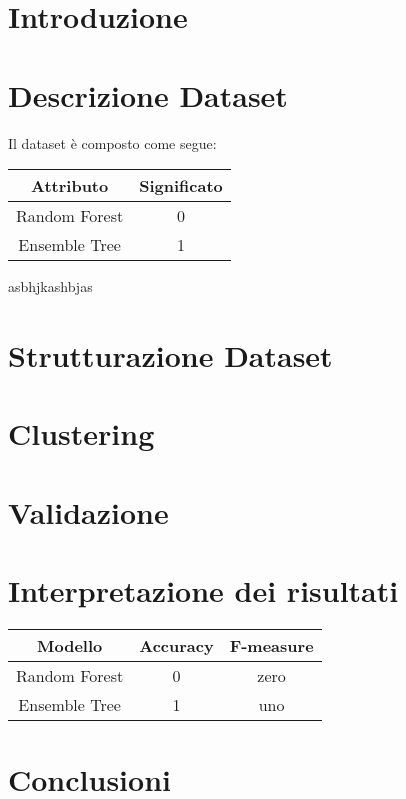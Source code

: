 \documentclass[10pt, a4paper,openany]{article}
\begin{document}
\begin{multicols}{2}
	
\section*{Introduzione}
\section*{Descrizione Dataset}
Il dataset è composto come segue:
\begin{table}[H]
\begin{tabular}{cc}
	\hline
	Attributo         & Significato         \\
	\hline
	Random Forest          & 0            \\
	Ensemble Tree         & 1           \\
	\hline
\end{tabular}
\end{table}

asbhjkashbjas
\section*{Strutturazione Dataset}
\section*{Clustering}
\section*{Validazione}
\section*{Interpretazione dei risultati}

\begin{tabular}{ccc}
	\hline
	Modello         & Accuracy        & F-measure       \\
	\hline
	Random Forest          & 0     & zero          \\
	Ensemble Tree         & 1     & uno           \\
	\hline
\end{tabular}
\section*{Conclusioni}

\end{multicols}
\end{document}
